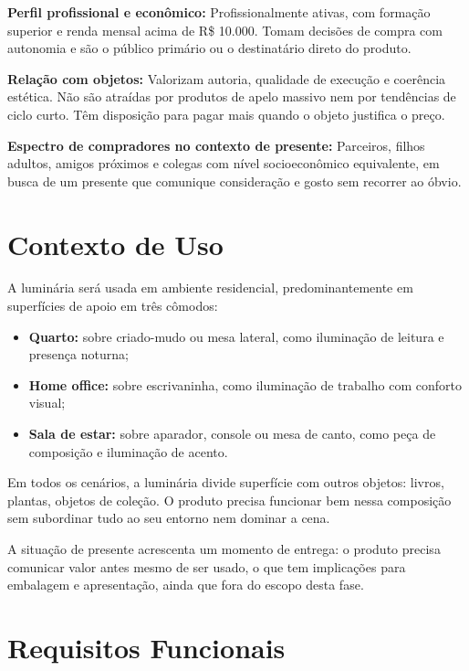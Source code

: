 \documentclass[
  12pt,
  a4paper,
  oneside,
  brazil
]{article}
\let\oldsection\section
\renewcommand{\section}{\clearpage\oldsection}
\providecommand{\tightlist}{\setlength{\itemsep}{0pt}\setlength{\parskip}{0pt}}
\begin{document}
\vspace{0.5em}
\noindent\textbf{Perfil profissional e econômico:} Profissionalmente ativas, com
formação superior e renda mensal acima de R\$ 10.000. Tomam decisões de compra com
autonomia e são o público primário ou o destinatário direto do produto.

\vspace{0.5em}
\noindent\textbf{Relação com objetos:} Valorizam autoria, qualidade de execução e
coerência estética. Não são atraídas por produtos de apelo massivo nem por tendências
de ciclo curto. Têm disposição para pagar mais quando o objeto justifica o preço.

\vspace{0.5em}
\noindent\textbf{Espectro de compradores no contexto de presente:} Parceiros, filhos
adultos, amigos próximos e colegas com nível socioeconômico equivalente, em busca de
um presente que comunique consideração e gosto sem recorrer ao óbvio.

\section{Contexto de Uso}

A luminária será usada em ambiente residencial, predominantemente em superfícies de
apoio em três cômodos:

\begin{itemize}
\tightlist
\item \textbf{Quarto:} sobre criado-mudo ou mesa lateral, como iluminação de leitura
  e presença noturna;
\item \textbf{Home office:} sobre escrivaninha, como iluminação de trabalho com
  conforto visual;
\item \textbf{Sala de estar:} sobre aparador, console ou mesa de canto, como peça de
  composição e iluminação de acento.
\end{itemize}

Em todos os cenários, a luminária divide superfície com outros objetos: livros,
plantas, objetos de coleção. O produto precisa funcionar bem nessa composição sem
subordinar tudo ao seu entorno nem dominar a cena.

A situação de presente acrescenta um momento de entrega: o produto precisa comunicar
valor antes mesmo de ser usado, o que tem implicações para embalagem e apresentação,
ainda que fora do escopo desta fase.

\section{Requisitos Funcionais}
\end{document}
